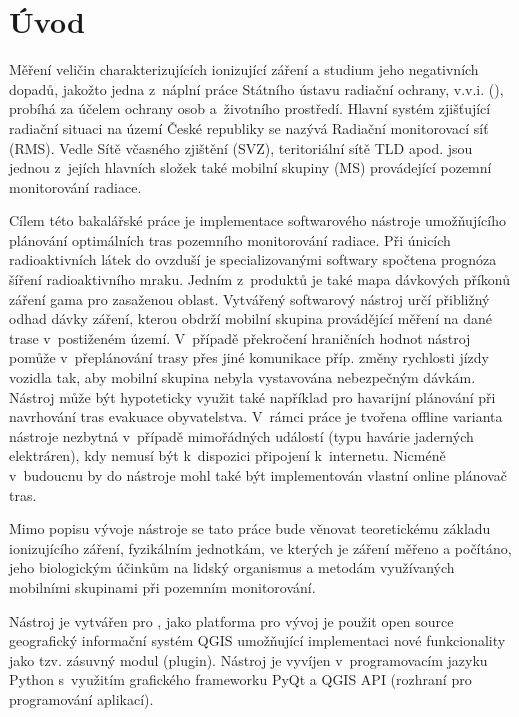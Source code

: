 \chapter{Úvod}
\label{1-uvod} Měření veličin charakterizujících ionizující záření a
studium jeho negativních dopadů, jakožto jedna z~náplní práce Státního
ústavu radiační ochrany, v.v.i. (), probíhá za účelem ochrany
osob a~životního prostředí.  Hlavní systém zjišťující radiační situaci
na území České republiky se nazývá Radiační monitorovací síť
(RMS). Vedle Sítě včasného zjištění (SVZ), teritoriální sítě TLD
apod. jsou jednou z~jejích hlavních složek také mobilní skupiny (MS)
provádející pozemní monitorování radiace. \cite{suroRMS}

Cílem této bakalářské práce je implementace softwarového nástroje
umožňujícího plánování optimálních tras pozemního monitorování
radiace. Při únicích radioaktivních látek do ovzduší je
specializovanými softwary spočtena prognóza šíření radioaktivního
mraku. Jedním z~produktů je také mapa dávkových příkonů záření gama
pro zasaženou oblast. Vytvářený softwarový nástroj určí přibližný
odhad dávky záření, kterou obdrží mobilní skupina provádějící měření
na dané trase v~postiženém území. V~případě překročení hraničních
hodnot nástroj pomůže v~přeplánování trasy přes jiné komunikace
příp. změny rychlosti jízdy vozidla tak, aby mobilní skupina nebyla
vystavována nebezpečným dávkám.  Nástroj může být hypoteticky využit
také například pro havarijní plánování při navrhování tras evakuace
obyvatelstva. V~rámci práce je tvořena offline varianta nástroje
nezbytná v~případě mimořádných událostí (typu havárie jaderných
elektráren), kdy nemusí být k~dispozici připojení k~internetu. Nicméně
v~budoucnu by do nástroje mohl také být implementován vlastní online
plánovač tras.

Mimo popisu vývoje nástroje se tato práce bude věnovat teoretickému
základu ionizujícího záření, fyzikálním jednotkám, ve kterých je
záření měřeno a počítáno, jeho biologickým účinkům na lidský
organismus a metodám využívaných mobilními skupinami při pozemním
monitorování.

Nástroj je vytvářen pro , jako platforma pro vývoj je použit
open source geografický informační systém QGIS umožňující implementaci
nové funkcionality jako tzv. zásuvný modul (plugin). Nástroj je
vyvíjen v~programovacím jazyku Python s~využitím grafického frameworku
PyQt a QGIS API (rozhraní pro programování aplikací).
